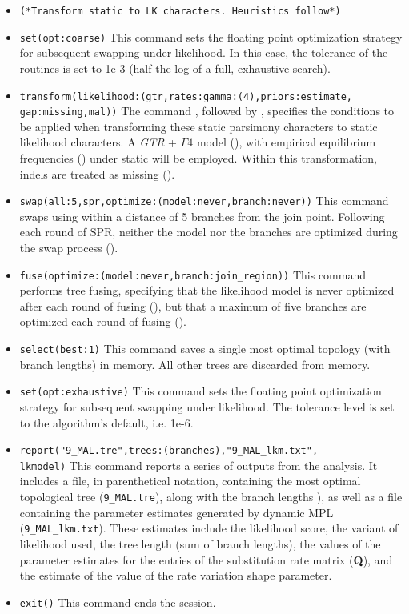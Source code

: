 \begin{itemize}
\item \texttt{(*Transform static to LK characters. Heuristics follow*)}
\item \texttt{set(opt:coarse)} This command sets the floating point optimization strategy for subsequent swapping
under likelihood. In this case, the tolerance of the routines is set to 1e-3 (half the log of a full, exhaustive search).
\item \texttt{transform(likelihood:(gtr,rates:gamma:(4),priors:estimate,\\gap:missing,mal))} The command 
, followed by , specifies the conditions to be applied when 
transforming these static parsimony characters to static likelihood characters.  
A \emph{GTR} + $\Gamma 4$ model (), 
with empirical equilibrium frequencies () under static  will be employed. 
Within this transformation, indels are treated as missing (). 
\item \texttt{swap(all:5,spr,optimize:(model:never,branch:never))} This command swaps using  
within a distance of 5 branches from the join point. Following each round of SPR, neither the model nor the branches 
are optimized during the swap process ().   
\item \texttt{fuse(optimize:(model:never,branch:join\_region))} This command performs tree fusing, specifying that 
the likelihood model is never optimized after each round of fusing (), but that 
a maximum of five branches are optimized each round of fusing (). 
\item \texttt{select(best:1)} This command saves a single most optimal topology (with branch lengths) in 
memory. All other trees are discarded from memory.
\item \texttt{set(opt:exhaustive)} This command sets the floating point optimization strategy for subsequent swapping
under likelihood. The tolerance level is set to the algorithm's default, i.e. 1e-6. 
\item \texttt{report("9\_MAL.tre",trees:(branches),"9\_MAL\_lkm.txt",\\ lkmodel)} This command reports a series 
of outputs from the analysis. It includes a file, in parenthetical notation, containing the most optimal topological tree 
(\texttt{9\_MAL.tre}), along with the branch lengths ), as well as a file 
containing the parameter estimates generated by dynamic MPL (\texttt{9\_MAL\_lkm.txt}). These estimates include
the likelihood score, the variant of likelihood used, the tree length (sum of branch lengths), the values 
of the parameter estimates for the entries of the substitution rate matrix (\textbf{Q}), and the estimate of the value of 
the rate variation shape parameter.
\item \texttt{exit()} This command ends the \poy session.
\end{itemize}

